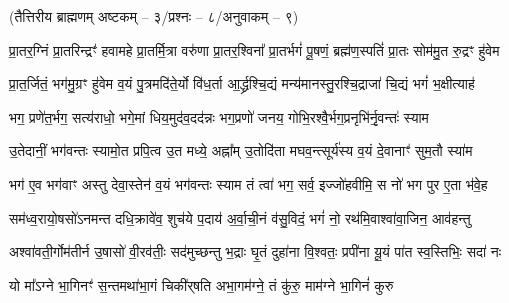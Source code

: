 

\vspace{-1ex}
\centerline{\normalsize(तैत्तिरीय ब्राह्मणम् अष्टकम् – ३/प्रश्नः – ८/अनुवाकम् – ९)}


\twolineshloka
{प्रा॒तर॒ग्निं प्रा॒तरिन्द्रꣳ॑ हवामहे प्रा॒तर्मि॒त्रा वरु॑णा प्रा॒तर॒श्विना᳚}
{प्रा॒तर्भगं॑ पू॒षणं॒ ब्रह्म॑ण॒स्पतिं॑ प्रा॒तः सोम॑मु॒त रु॒द्रꣳ हु॑वेम}

\twolineshloka
{प्रा॒त॒र्जितं॒ भग॑मु॒ग्रꣳ हु॑वेम व॒यं पु॒त्रमदि॑ते॒र्यो वि॑ध॒र्ता}
{आ॒र्द्ध्रश्चि॒द्यं मन्य॑मानस्तु॒रश्चि॒द्राजा॑ चि॒द्यं भगं॑ भ॒क्षीत्याह॑}

\twolineshloka
{भग॒ प्रणे॑त॒र्भग॒ सत्य॑राधो॒ भगे॒मां धिय॒मुद॑व॒दद॑न्नः}
{भग॒प्रणो॑ जनय॒ गोभि॒रश्वै॒र्भग॒प्रनृभि॑र्नृ॒वन्तः॑ स्याम}

\twolineshloka
{उ॒तेदानीं॒ भग॑वन्तः स्यामो॒त प्रपि॒त्व उ॒त मध्ये॒ अह्ना᳚म्}
{उ॒तोदि॑ता मघव॒न्त्सूर्य॑स्य व॒यं दे॒वानाꣳ॑ सुम॒तौ स्या॑म}

\twolineshloka
{भग॑ ए॒व भग॑वाꣳ अस्तु देवा॒स्तेन॑ व॒यं भग॑वन्तः स्याम}
{तं त्वा॑ भग॒ सर्व॒ इज्जो॑हवीमि॒ स नो॑ भग पुर ए॒ता भ॑वे॒ह}

\twolineshloka
{सम॑ध्व॒रायो॒षसो॑ऽनमन्त दधि॒क्रावे॑व॒ शुच॑ये प॒दाय॑}
{अ॒र्वा॒ची॒नं व॑सु॒विदं॒ भगं॑ नो॒ रथ॑मि॒वाश्वा॑वा॒जिन॒ आव॑हन्तु}

\twolineshloka
{अश्वा॑वती॒र्गोम॑तीर्न उ॒षासो॑ वी॒रव॑तीः॒ सद॑मुच्छन्तु भ॒द्राः}
{घृ॒तं दुहा॑ना वि॒श्वतः॒ प्रपी॑ना यू॒यं पा॑त स्व॒स्तिभिः॒ सदा॑ नः}

\twolineshloka
{यो मा᳚ऽग्ने भा॒गिनꣳ॑ स॒न्तमथा॑भा॒गं चिकी॑र्‌षति}
{अभा॒गम॑ग्ने॒ तं कु॑रु॒ माम॑ग्ने भा॒गिनं॑ कुरु}

